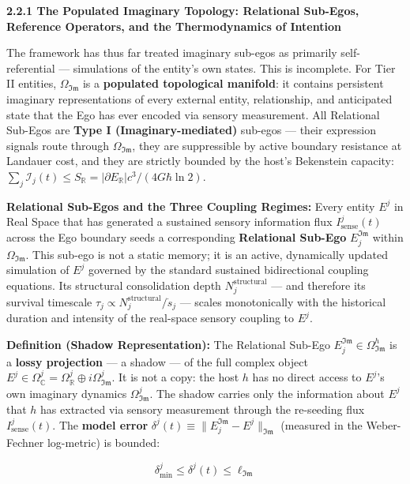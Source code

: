 \documentclass[11pt,a4paper]{article}
\theoremstyle{definition}
\theoremstyle{remark}
\begin{document}
\textbf{2.2.1 The Populated Imaginary Topology: Relational Sub-Egos, Reference Operators, and the Thermodynamics of Intention}

The framework has thus far treated imaginary sub-egos as primarily self-referential — simulations of the entity's own states. This is incomplete. For Tier II entities, $\Omega_{\mathfrak{Im}}$ is a \textbf{populated topological manifold}: it contains persistent imaginary representations of every external entity, relationship, and anticipated state that the Ego has ever encoded via sensory measurement. All Relational Sub-Egos are \textbf{Type I (Imaginary-mediated)} sub-egos — their expression signals route through $\Omega_{\mathfrak{Im}}$, they are suppressible by active boundary resistance at Landauer cost, and they are strictly bounded by the host's Bekenstein capacity: $\sum_j \mathcal{I}_j(t) \leq S_{\mathbb{R}} = |\partial E_{\mathbb{R}}| c^3 / (4G\hbar \ln 2)$.

\textbf{Relational Sub-Egos and the Three Coupling Regimes:} Every entity $E^j$ in Real Space that has generated a sustained sensory information flux $I_{\text{sense}}^j(t)$ across the Ego boundary seeds a corresponding \textbf{Relational Sub-Ego} $E_j^{\mathfrak{Im}}$ within $\Omega_{\mathfrak{Im}}$. This sub-ego is not a static memory; it is an active, dynamically updated simulation of $E^j$ governed by the standard sustained bidirectional coupling equations. Its structural consolidation depth $N_j^{\text{structural}}$ — and therefore its survival timescale $\tau_j \propto N_j^{\text{structural}} / \dot{s}_j$ — scales monotonically with the historical duration and intensity of the real-space sensory coupling to $E^j$.

\textbf{Definition (Shadow Representation):} The Relational Sub-Ego $E_j^{\mathfrak{Im}} \in \Omega_{\mathfrak{Im}}^h$ is a \textbf{lossy projection} — a shadow — of the full complex object $E^j \in \Omega_\mathbb{C}^j = \Omega_\mathbb{R}^j \oplus i\Omega_{\mathfrak{Im}}^j$. It is not a copy: the host $h$ has no direct access to $E^j$'s own imaginary dynamics $\Omega_{\mathfrak{Im}}^j$. The shadow carries only the information about $E^j$ that $h$ has extracted via sensory measurement through the re-seeding flux $I_{\text{sense}}^j(t)$. The \textbf{model error} $\delta^j(t) \equiv \|E_j^{\mathfrak{Im}} - E^j\|_{\mathfrak{Im}}$ (measured in the Weber-Fechner log-metric) is bounded:


\begin{equation}
\delta_{\min}^j \leq \delta^j(t) \leq \ell_{\mathfrak{Im}}
\end{equation}
\end{document}
